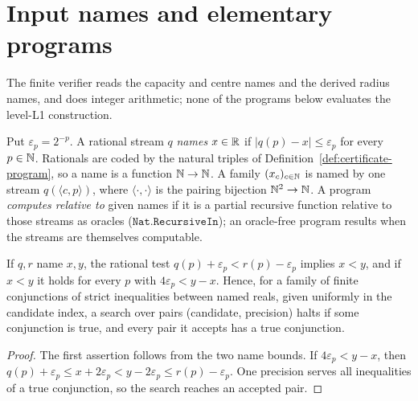 \section{Input names and elementary programs}\label{sec:efd}

The finite verifier reads the capacity and centre names and the derived radius names, and does integer arithmetic; none of the programs below evaluates the level-L1 construction.

\begin{definition}[Names]\label{def:efd-interface}
Put $\varepsilon_p=2^{-p}$. A rational stream $q$ \emph{names} $x\in\mathbb{R}$ if $|q(p)-x|\le\varepsilon_p$ for every
$p\in\mathbb{N}$. Rationals are coded by the natural triples of Definition~\ref{def:certificate-program}, so a name is a
function $\mathbb{N}\to\mathbb{N}$. A family $(x_c)_{c\in\mathbb{N}}$ is named by one stream $q(\langle c,p\rangle)$, where
$\langle\cdot,\cdot\rangle$ is the pairing bijection $\mathbb{N}^2\to\mathbb{N}$. A program \emph{computes relative to} given names if
it is a partial recursive function relative to those streams as oracles ($\mathtt{Nat.RecursiveIn}$); an
oracle-free program results when the streams are themselves computable.
\end{definition}

\begin{lemma}\label{lem:efd-search}
If $q,r$ name $x,y$, the rational test $q(p)+\varepsilon_p<r(p)-\varepsilon_p$ implies $x<y$, and if $x<y$ it holds
for every $p$ with $4\varepsilon_p<y-x$. Hence, for a family of finite conjunctions of strict inequalities
between named reals, given uniformly in the candidate index, a search over pairs (candidate, precision) halts if
some conjunction is true, and every pair it accepts has a true conjunction.
\end{lemma}

\begin{proof}
The first assertion follows from the two name bounds. If $4\varepsilon_p<y-x$, then $q(p)+\varepsilon_p\le x+2\varepsilon_p<y-2\varepsilon_p\le r(p)-\varepsilon_p$. One precision serves all inequalities of a true conjunction, so the search reaches an accepted pair.
\end{proof}

